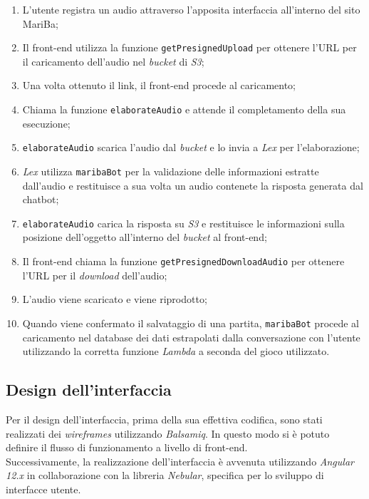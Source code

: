	\begin{enumerate}
		\item L'utente registra un audio attraverso l'apposita interfaccia all'interno del sito MariBa;
		\item Il front-end utilizza la funzione \texttt{getPresignedUpload} per ottenere l'URL per il caricamento dell'audio nel \emph{bucket} di \emph{S3};
		\item Una volta ottenuto il link, il front-end procede al caricamento;
		\item Chiama la funzione \texttt{elaborateAudio} e attende il completamento della sua esecuzione;
		\item \texttt{elaborateAudio} scarica l'audio dal \emph{bucket} e lo invia a \emph{Lex} per l'elaborazione;
		\item \emph{Lex} utilizza \texttt{maribaBot} per la validazione delle informazioni estratte dall'audio e restituisce a sua volta un audio contenete la risposta generata dal \gls{chatbot};
		\item \texttt{elaborateAudio} carica la risposta su \emph{S3} e restituisce le informazioni sulla posizione dell'oggetto all'interno del \emph{bucket} al front-end;
		\item Il front-end chiama la funzione \texttt{getPresignedDownloadAudio} per ottenere l'URL per il \emph{download} dell'audio;
		\item L'audio viene scaricato e viene riprodotto;
		\item Quando viene confermato il salvataggio di una partita, \texttt{maribaBot} procede al caricamento nel database dei dati estrapolati dalla conversazione con l'utente utilizzando la corretta funzione \emph{Lambda} a seconda del gioco utilizzato.
	\end{enumerate}
	
	\subsection{Design dell'interfaccia}
	Per il design dell'interfaccia, prima della sua effettiva codifica, sono stati realizzati dei \emph{wireframes} utilizzando \emph{Balsamiq}. In questo modo si è potuto definire il flusso di funzionamento a livello di front-end. \\ 
	
	\noindent Successivamente, la realizzazione dell'interfaccia è avvenuta utilizzando \emph{Angular 12.x} in collaborazione con la libreria 
	\emph{Nebular}, specifica per lo sviluppo di interfacce utente. \\
	
